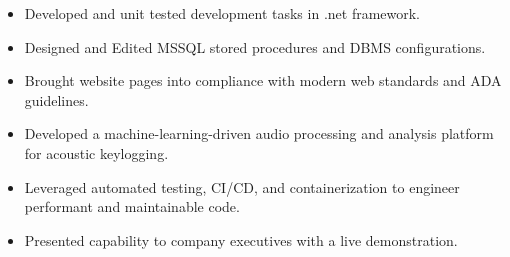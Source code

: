 \documentclass[10pt,a4paper,ragged2e,withhyper]{altacv}
\begin{document}
\divider{}

\begin{itemize}
\item Developed and unit tested development tasks in .net framework.
\item Designed and Edited MSSQL stored procedures and DBMS configurations.
\item Brought website pages into compliance with modern web standards and ADA guidelines.
\end{itemize}

\divider{}

\begin{itemize}
\item Developed a machine-learning-driven audio processing and analysis platform for acoustic keylogging.
\item Leveraged automated testing, CI/CD, and containerization to engineer performant and maintainable code.
\item Presented capability to company executives with a live demonstration.
\end{itemize}




\end{document}
